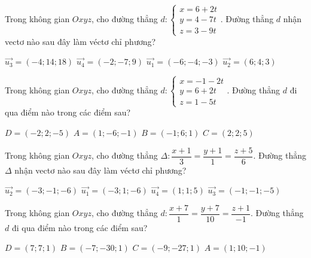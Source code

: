 \documentclass[12pt,a4paper]{article}
\begin{document}
\begin{ex}
 Trong không gian ${Oxyz}$, cho đường thẳng ${d}:\left\{ \begin{array}{l}x = 6+2t\\ y = 4-7t\\z = 3-9t\end{array} \right.$. Đường thẳng ${d}$ nhận vectơ nào sau đây làm véctơ chỉ phương?
 
\choice
{ \True $\overrightarrow{u_3}=(-4;14;18)$ }
   { $\overrightarrow{u_4}=(-2;-7;9)$ }
     { $\overrightarrow{u_1}=(-6;-4;-3)$ }
    { $\overrightarrow{u_2}=(6;4;3)$ }
\end{ex}

\begin{ex}
 Trong không gian ${Oxyz}$, cho đường thẳng ${d}:\left\{ \begin{array}{l}x = -1-2t\\ y = 6+2t\\z = 1-5t\end{array} \right.$. Đường thẳng ${d}$ đi qua điểm nào trong các điểm sau?
 
\choice
{ $D=(-2;2;-5)$ }
   { $A=(1;-6;-1)$ }
     { \True $B=(-1;6;1)$ }
    { $C=(2;2;5)$ }
\end{ex}

\begin{ex}
 Trong không gian ${Oxyz}$, cho đường thẳng ${\Delta}:\dfrac{x + 1}{3}=\dfrac{y + 1}{1}=\dfrac{z + 5}{6}$. Đường thẳng ${\Delta}$ nhận vectơ nào sau đây làm véctơ chỉ phương?
 
\choice
{ \True $\overrightarrow{u_2}=(-3;-1;-6)$ }
   { $\overrightarrow{u_1}=(-3;1;-6)$ }
     { $\overrightarrow{u_4}=(1;1;5)$ }
    { $\overrightarrow{u_3}=(-1;-1;-5)$ }
\end{ex}

\begin{ex}
 Trong không gian ${Oxyz}$, cho đường thẳng ${d}:\dfrac{x + 7}{1}=\dfrac{y + 7}{10}=\dfrac{z + 1}{-1}$. Đường thẳng ${d}$ đi qua điểm nào trong các điểm sau?
 
\choice
{ $D=(7;7;1)$ }
   { $B=(-7;-30;1)$ }
     { \True $C=(-9;-27;1)$ }
    { $A=(1;10;-1)$ }
\end{ex}
\end{document}

